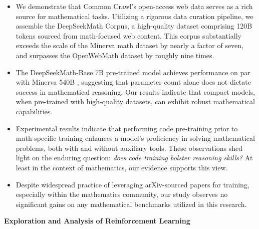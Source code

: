 \begin{itemize}[topsep=0pt]
    \item We demonstrate that Common Crawl's open-access web data serves as a rich source for mathematical tasks. Utilizing a rigorous data curation pipeline, we assemble the DeepSeekMath Corpus, a high-quality dataset comprising 120B tokens sourced from math-focused web content. This corpus substantially exceeds the scale of the Minerva math dataset \citep{minerva} by nearly a factor of seven, and surpasses the OpenWebMath dataset \citep{openwebmath} by roughly nine times.

    \item The DeepSeekMath-Base 7B pre-trained model achieves performance on par with Minerva 540B \citep{minerva}, suggesting that parameter count alone does not dictate success in mathematical reasoning. Our results indicate that compact models, when pre-trained with high-quality datasets, can exhibit robust mathematical capabilities.

    \item Experimental results indicate that performing code pre-training prior to math-specific training enhances a model’s proficiency in solving mathematical problems, both with and without auxiliary tools. These observations shed light on the enduring question: \textit{does code training bolster reasoning skills?} At least in the context of mathematics, our evidence supports this view.

    \item Despite widespread practice of leveraging arXiv-sourced papers for training, especially within the mathematics community, our study observes no significant gains on any mathematical benchmarks utilized in this research.
\end{itemize}

\textbf{Exploration and Analysis of Reinforcement Learning}

